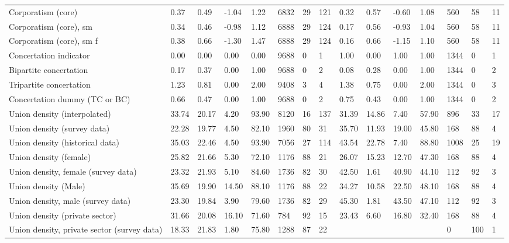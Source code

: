 \begin{longtable}{lllllllllllllll}
Corporatism (core) & 0.37 & 0.49 & -1.04 & 1.22 & 6832 & 29 & 121 & 0.32 & 0.57 & -0.60 & 1.08 & 560 & 58 & 11\\
\addlinespace
Corporatism (core), sm & 0.34 & 0.46 & -0.98 & 1.12 & 6888 & 29 & 124 & 0.17 & 0.56 & -0.93 & 1.04 & 560 & 58 & 11\\
Corporatism (core), sm f & 0.38 & 0.66 & -1.30 & 1.47 & 6888 & 29 & 124 & 0.16 & 0.66 & -1.15 & 1.10 & 560 & 58 & 11\\
Concertation indicator & 0.00 & 0.00 & 0.00 & 0.00 & 9688 & 0 & 1 & 1.00 & 0.00 & 1.00 & 1.00 & 1344 & 0 & 1\\
Bipartite concertation & 0.17 & 0.37 & 0.00 & 1.00 & 9688 & 0 & 2 & 0.08 & 0.28 & 0.00 & 1.00 & 1344 & 0 & 2\\
Tripartite concertation & 1.23 & 0.81 & 0.00 & 2.00 & 9408 & 3 & 4 & 1.38 & 0.75 & 0.00 & 2.00 & 1344 & 0 & 3\\
\addlinespace
Concertation dummy (TC or BC) & 0.66 & 0.47 & 0.00 & 1.00 & 9688 & 0 & 2 & 0.75 & 0.43 & 0.00 & 1.00 & 1344 & 0 & 2\\
Union density (interpolated) & 33.74 & 20.17 & 4.20 & 93.90 & 8120 & 16 & 137 & 31.39 & 14.86 & 7.40 & 57.90 & 896 & 33 & 17\\
Union density (survey data) & 22.28 & 19.77 & 4.50 & 82.10 & 1960 & 80 & 31 & 35.70 & 11.93 & 19.00 & 45.80 & 168 & 88 & 4\\
Union density (historical data) & 35.03 & 22.46 & 4.50 & 93.90 & 7056 & 27 & 114 & 43.54 & 22.78 & 7.40 & 88.80 & 1008 & 25 & 19\\
Union density (female) & 25.82 & 21.66 & 5.30 & 72.10 & 1176 & 88 & 21 & 26.07 & 15.23 & 12.70 & 47.30 & 168 & 88 & 4\\
\addlinespace
Union density, female (survey data) & 23.32 & 21.93 & 5.10 & 84.60 & 1736 & 82 & 30 & 42.50 & 1.61 & 40.90 & 44.10 & 112 & 92 & 3\\
Union density (Male) & 35.69 & 19.90 & 14.50 & 88.10 & 1176 & 88 & 22 & 34.27 & 10.58 & 22.50 & 48.10 & 168 & 88 & 4\\
Union density, male (survey data) & 23.30 & 19.84 & 3.90 & 79.60 & 1736 & 82 & 29 & 45.30 & 1.81 & 43.50 & 47.10 & 112 & 92 & 3\\
Union density (private sector) & 31.66 & 20.08 & 16.10 & 71.60 & 784 & 92 & 15 & 23.43 & 6.60 & 16.80 & 32.40 & 168 & 88 & 4\\
Union density, private sector (survey data) & 18.33 & 21.83 & 1.80 & 75.80 & 1288 & 87 & 22 &  &  &  &  & 0 & 100 & 1\\

\end{longtable}
